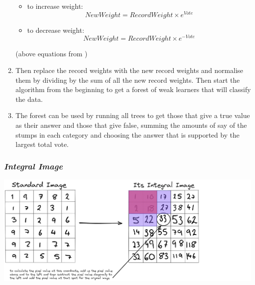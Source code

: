 \begin{enumerate}
    \begin{itemize}
        \item to increase weight: $$NewWeight = Record Weight \times e^{Vote}$$
        \item to decrease weight: $$New Weight = Record Weight \times e^{-Vote}$$
    \end{itemize}
    \caption{(above equations from \cite{JoshStarmer})}
    \item Then replace the record weights with the new record weights and normalise them by dividing by the sum of all the new record weights. Then start the algorithm from the beginning to get a forest of weak learners that will classify the data.
    \item The forest can be used by running all trees to get those that give a true value as their answer and those that give false, summing the amounts of say of the stumps in each category and choosing the answer that is supported by the largest total vote.
\end{enumerate}

\subsubsection{\textit{Integral Image}}
\includegraphics[scale = 0.21]{images/integral image.png}


